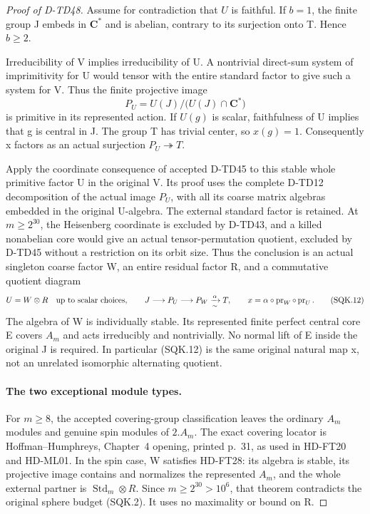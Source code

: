 \begin{proof}[Proof of D-TD48]
Assume for contradiction that \(U\) is faithful.
If \(b=1\), the finite group J embeds in \(\mathbf C^*\)
and is abelian, contrary to its surjection onto T.
Hence \(b\ge2\).

Irreducibility of V implies irreducibility of U.  A nontrivial
direct-sum system of imprimitivity for U would tensor with
the entire standard factor to give such a system for V.
Thus the finite projective image
\[
                         P_U=U(J)/\bigl(U(J)\cap\mathbf C^*\bigr)
 \tag{SQK.11}
\]
is primitive in its represented action.
If \(U(g)\) is scalar, faithfulness of U implies that g
is central in J.  The group T has trivial center, so
\(x(g)=1\).  Consequently x factors as an actual surjection
\(P_U\twoheadrightarrow T\).

Apply the coordinate consequence of accepted D-TD45 to
this stable whole primitive factor U in the original V.
Its proof uses the complete D-TD12 decomposition of the
actual image \(P_U\), with all its coarse matrix algebras
embedded in the original U-algebra.  The external standard
factor is retained.  At \(m\ge2^{30}\), the Heisenberg
coordinate is excluded by D-TD43, and a killed nonabelian
core would give an actual tensor-permutation quotient,
excluded by D-TD45 without a restriction on its orbit size.
Thus the conclusion is an actual singleton coarse factor W,
an entire residual factor R, and a commutative quotient
diagram
\[
 U=W\otimes R\quad\hbox{up to scalar choices},\qquad
 J\longrightarrow P_U\longrightarrow P_W
       \xrightarrow[\sim]{\alpha}T,\qquad
 x=\alpha\circ\operatorname{pr}_W\circ\operatorname{pr}_U .
 \tag{SQK.12}
\]
The algebra of W is individually stable.  Its represented
finite perfect central core E covers \(A_m\) and acts
irreducibly and nontrivially.  No normal lift of E inside
the original J is required.  In particular (SQK.12) is the
same original natural map x, not an unrelated isomorphic
alternating quotient.

\paragraph{The two exceptional module types.}
For \(m\ge8\), the accepted covering-group classification
leaves the ordinary \(A_m\) modules and genuine spin modules
of \(2.A_m\).  The exact covering locator is
Hoffman--Humphreys, Chapter~4 opening, printed p.~31,
as used in HD-FT20 and HD-ML01.\cite{BI:HHM}
In the spin case, W satisfies HD-FT28: its algebra is
stable, its projective image contains and normalizes the
represented \(A_m\), and the whole external partner is
\(\operatorname{Std}_m\otimes R\).  Since \(m\ge2^{30}>10^6\),
that theorem contradicts the original sphere budget
(SQK.2).  It uses no maximality or bound on R.


\end{proof}
